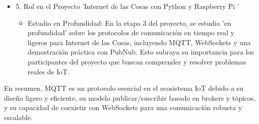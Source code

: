 \documentclass{report}
\begin{document}
\begin{itemize}
    \item 5. Rol en el Proyecto 'Internet de las Cosas con Python y Raspberry Pi '
    \begin{itemize}
        \item Estudio en Profundidad: En la etapa 3 del proyecto, se estudia   'en profundidad'  sobre los protocolos de comunicación en tiempo 
        real y ligeros para Internet de las Cosas, incluyendo MQTT, WebSockets y una demostración práctica con PubNub. Esto subraya su importancia 
        para los participantes del proyecto que buscan comprender y resolver problemas reales de IoT.
    \end{itemize}
\end{itemize}
En resumen, MQTT es un protocolo esencial en el ecosistema IoT debido a su diseño ligero y eficiente, su modelo publicar/suscribir basado en 
brokers y tópicos, y su capacidad de coexistir con WebSockets para una comunicación robusta y escalable.
\end{document}
